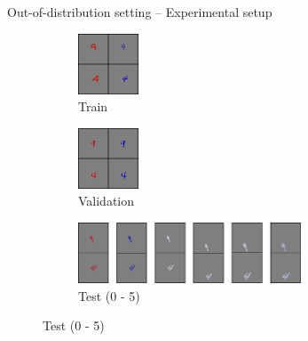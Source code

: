 \begin{frame}{Out-of-distribution setting -- Experimental setup}
	\begin{figure}[H]
		\centering
		\begin{subfigure}[b]{0.2\textwidth}
			\centering
			\includegraphics[height=1.8cm]{img/distribution/train_collage.png}
			\caption*{Train}
		\end{subfigure}%
		\hfill
		\begin{subfigure}[b]{0.2\textwidth}
			\centering
			\includegraphics[height=1.8cm]{img/distribution/val_collage.png}
			\caption*{Validation}
		\end{subfigure}%
		\hfill
		\begin{subfigure}[b]{0.6\textwidth}
			\centering
			\includegraphics[height=1.8cm]{img/distribution/test_collage2.png}
			\caption*{Test (0 - 5)}
		\end{subfigure}
	\end{figure}

\end{frame}



	
	

